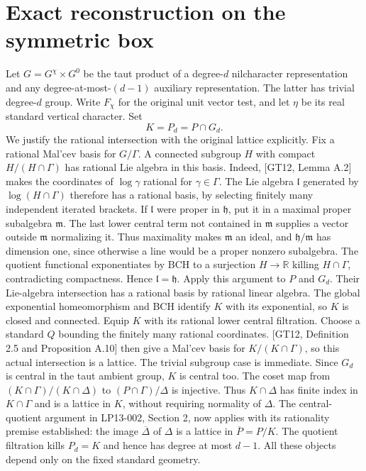 \documentclass[11pt]{article}
\begin{document}
\section{Exact reconstruction on the symmetric box}
Let $G=G^{\chi}\times G^0$ be the taut product of a degree-$d$ nilcharacter
representation and any degree-at-most-$(d-1)$ auxiliary representation.
The latter has trivial degree-$d$ group. Write $F_\chi$ for the original
unit vector test, and let $\eta$ be its real standard vertical character.
Set
\[
                K=P_d=P\cap G_d.
\]
We justify the rational intersection with the original lattice explicitly.
Fix a rational Mal'cev basis for $G/\Gamma$. A connected subgroup $H$
with compact $H/(H\cap\Gamma)$ has rational Lie algebra in this basis.
Indeed, [GT12, Lemma A.2] makes the coordinates of $\log\gamma$ rational
for $\gamma\in\Gamma$. The Lie algebra $\mathfrak l$ generated by
$\log(H\cap\Gamma)$ therefore has a rational basis, by selecting finitely
many independent iterated brackets. If $\mathfrak l$ were proper in
$\mathfrak h$, put it in a maximal proper subalgebra $\mathfrak m$.
The last lower central term not contained in $\mathfrak m$ supplies a
vector outside $\mathfrak m$ normalizing it. Thus maximality makes
$\mathfrak m$ an ideal, and $\mathfrak h/\mathfrak m$ has dimension one,
since otherwise a line would be a proper nonzero subalgebra. The quotient
functional exponentiates by BCH to a surjection $H\to\mathbb R$ killing
$H\cap\Gamma$, contradicting compactness. Hence $\mathfrak l=\mathfrak h$.
Apply this argument to $P$ and $G_d$. Their Lie-algebra intersection has
a rational basis by rational linear algebra. The global exponential
homeomorphism and BCH identify $K$ with its exponential, so $K$ is closed
and connected. Equip $K$ with its rational lower central filtration.
Choose a standard $Q$ bounding the finitely many rational coordinates.
[GT12, Definition 2.5 and Proposition A.10] then give a Mal'cev basis for
$K/(K\cap\Gamma)$, so this actual intersection is a lattice. The trivial
subgroup case is immediate. Since $G_d$ is central in the taut ambient
group, $K$ is central too.
The coset map from $(K\cap\Gamma)/(K\cap\Delta)$ to
$(P\cap\Gamma)/\Delta$ is injective. Thus $K\cap\Delta$ has finite index
in $K\cap\Gamma$ and is a lattice in $K$, without requiring normality
of $\Delta$. The central-quotient argument in LP13-002, Section 2, now
applies with its rationality premise established: the image
$\overline\Delta$ of $\Delta$ is a lattice in $\overline P=P/K$.
The quotient filtration kills $P_d=K$ and hence has degree at most $d-1$.
All these objects depend only on the fixed standard geometry.
\end{document}
